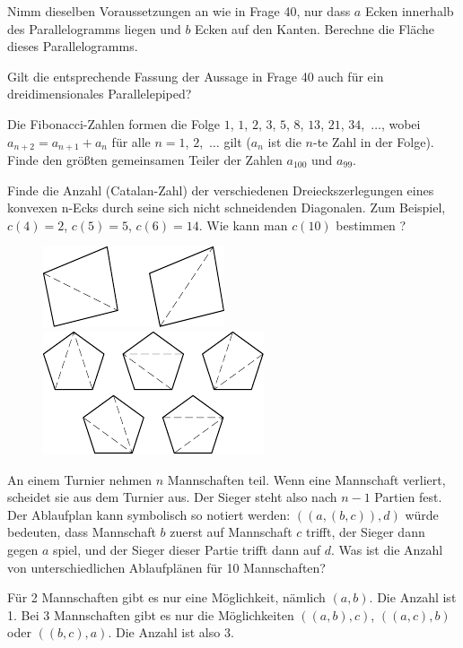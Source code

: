 \documentclass[12pt]{article} %
\begin{document}
\medskip
{} Nimm dieselben Voraussetzungen an wie in Frage 40, nur dass $a$ Ecken innerhalb des Parallelogramms liegen und $b$ Ecken auf den Kanten. Berechne die Fläche dieses Parallelogramms.

\bigskip
{} Gilt die entsprechende Fassung der Aussage in Frage 40 auch für ein dreidimensionales Parallelepiped?

\bigskip
{} Die Fibonacci-Zahlen formen die Folge $1$, $1$, $2$, $3$, $5$, $8$, $13$, $21$,
$34$,\nobreak\ $\dots$, wobei $a_{n+2}=a_{n+1}+a_n$ für alle
$n=1$, $2$,\nobreak\ $\dots$ gilt ($a_n$ ist die $n$-te Zahl in der Folge). Finde den größten gemeinsamen Teiler der Zahlen $a_{100}$ und $a_{99}$.

\newpage
{} Finde die Anzahl (Catalan-Zahl) der verschiedenen Dreieckszerlegungen eines konvexen n-Ecks durch seine sich nicht schneidenden Diagonalen.
Zum Beispiel, $c(4)=2$, $c(5)=5$, $c(6)=14$. Wie kann man $c(10)$ bestimmen ?

\begin{figure}[h]
\centering
\includegraphics[scale=1]{taskbook-281}
\hskip1cm\includegraphics[scale=1]{taskbook-282}
\end{figure}


{} An einem Turnier nehmen $n$ Mannschaften teil. Wenn eine Mannschaft verliert, scheidet sie aus dem Turnier aus. Der Sieger steht also nach $n-1$ Partien fest. 
Der Ablaufplan kann symbolisch so notiert werden: $((a,(b,c)),d)$ würde bedeuten, dass Mannschaft $b$ zuerst  auf Mannschaft $c$ trifft, der Sieger dann gegen $a$ spiel, und der Sieger dieser Partie trifft dann auf $d$. 
Was ist die Anzahl von unterschiedlichen Ablaufplänen für 10 Mannschaften?

Für 2 Mannschaften gibt es nur eine Möglichkeit, nämlich $(a,b)$. Die Anzahl ist 1.
Bei 3 Mannschaften gibt es nur die Möglichkeiten $((a,b),c)$, $((a,c),b)$ oder $((b,c),a)$. Die Anzahl ist also 3.
\end{document}

